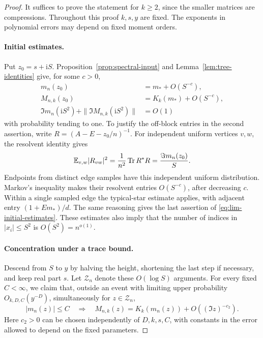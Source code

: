 \begin{proof}
It suffices to prove the statement for \(k\ge2\), since the smaller
matrices are compressions. Throughout this proof \(k,s,y\) are fixed.
The exponents in polynomial errors may depend on fixed moment orders.

\paragraph{Initial estimates.}
Put \(z_0=s+\mathrm i S\). Proposition~\ref{prop:spectral-input} and
Lemma~\ref{lem:tree-identities} give, for some \(c>0\),
\begin{equation}\label{eq:lim-initial-estimates}
 \begin{split}
  m_n(z_0)&=m_*+O(S^{-c}),\\
  M_{n,k}(z_0)&=K_k(m_*)+O(S^{-c}),\\
  \Im m_n(\mathrm i S^2)+\|\Im M_{n,k}(\mathrm i S^2)\|&=O(1)
 \end{split}
\end{equation}
with probability tending to one. To justify the off-block entries in the
second assertion, write \(R=(A-E-z_0/n)^{-1}\). For independent uniform
vertices \(v,w\), the resolvent identity gives
\[
 \mathbb E_{v,w}|R_{vw}|^2
 =\frac1{n^2}\operatorname{Tr} R^*R
 =\frac{\Im m_n(z_0)}{S}.
\]
Endpoints from distinct edge samples have this independent uniform
distribution. Markov's inequality makes their resolvent entries
\(O(S^{-c})\), after decreasing \(c\). Within a single sampled edge the
typical-star estimate applies, with adjacent entry
\((1+E m_*)/d\). The same reasoning gives the last assertion of
\eqref{eq:lim-initial-estimates}. These estimates also imply that the
number of indices in \(|x_i|\le S^2\) is \(O(S^2)=n^{o(1)}\).

\paragraph{Concentration under a trace bound.}
Descend from \(S\) to \(y\) by halving the height, shortening the last
step if necessary, and keep real part \(s\). Let \(\mathcal Z_n\) denote
these \(O(\log S)\) arguments. For every fixed \(C<\infty\), we claim
that, outside an event with limiting upper probability
\(O_{k,D,C}(y^{-D})\), simultaneously for \(z\in\mathcal Z_n\),
\begin{equation}\label{eq:lim-concentration-implication}
 |m_n(z)|\le C
 \quad\Longrightarrow\quad
 M_{n,k}(z)=K_k(m_n(z))+O((\Im z)^{-c_2}).
\end{equation}
Here \(c_2>0\) can be chosen independently of \(D,k,s,C\), with constants
in the error allowed to depend on the fixed parameters.


\end{proof}
